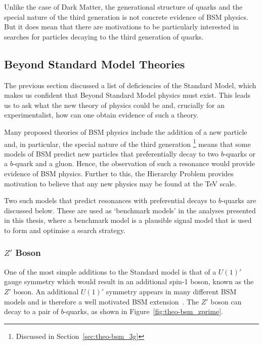 Unlike the case of Dark Matter,
the generational structure of quarks
and the special nature of the third generation is not concrete evidence
of BSM physics.
But it does mean that there are motivations to be particularly interested in
searches for particles decaying to the third generation of quarks.

\newpage
\subsection{Beyond Standard Model Theories}
\label{sec:theo-bsm_models}

The previous section discussed a list of deficiencies of the Standard Model,
which makes us confident that Beyond Standard Model physics must exist.
This leads us to ask what the new theory of physics could be
and, crucially for an experimentalist,
how can one obtain evidence of such a theory.

Many proposed theories of BSM physics include the addition of a new particle and,
in particular, the special nature of the third generation
\footnote{Discussed in Section~\ref{sec:theo-bsm_3g}}
means that some models of BSM predict new particles
that preferentially decay to two $b$-quarks or a $b$-quark and a gluon.
Hence, the observation of such a resonance would provide evidence of BSM physics.
Further to this, the Hierarchy Problem provides motivation to believe
that any new physics may be found at the TeV scale.

Two such models that predict resonances with preferential decays to $b$-quarks
are discussed below.
These are used as `benchmark models' in the analyses presented in this thesis,
where a benchmark model is a plausible signal model 
that is used to form and optimise a search strategy.

\subsubsection{$Z'$ Boson}
\label{sec:theo-bsm_zprime}

One of the most simple additions to the Standard model is that of a $U(1)'$ gauge symmetry
which would result in an additional spin-1 boson, known as the $Z'$ boson.
An additional $U(1)'$ symmetry appears in many different BSM models and is therefore a well motivated BSM extension~\cite{theo-bsm_zprime}.
The $Z'$ boson can decay to a pair of $b$-quarks, as shown in Figure~\ref{fig:theo-bsm_zprime}.

